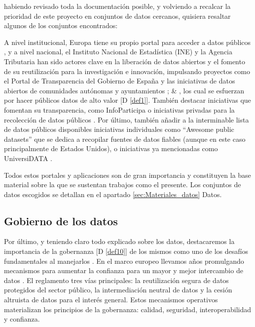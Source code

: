	habiendo revisado toda la documentación posible, y volviendo a recalcar la prioridad de este proyecto en conjuntos de datos cercanos, quisiera resaltar algunos de los conjuntos encontrados:
	
	A nivel institucional, Europa tiene su propio portal para acceder a datos públicos \citep{PortalDatosEuropa}, y a nivel nacional, el Instituto Nacional de Estadística (INE) y la Agencia Tributaria han sido actores clave en la liberación de datos abiertos y el fomento de su reutilización para la investigación e innovación, impulsando proyectos como el Portal de Transparencia del Gobierno de España y las iniciativas de datos abiertos de comunidades autónomas y ayuntamientos \citep{PortalDatosGob}; \citep{PortalDatosMadrid} \& \citep{PortalRegistradores}, los cual se esfuerzan por hacer públicos datos de alto valor [D \ref{def1}]. También destacar iniciativas que fomentan su transparencia, como InfoParticipa \citep{PortalInfoparticipa} o iniciativas privadas para la recolección de datos públicos \citep{PortalEsriEspanna}. Por último, también añadir a la interminable lista de datos públicos disponibles iniciativas individuales como ``Awesome public datasets'' \citep{awesomePublicDatasets} que se dedica a recopilar fuentes de datos fiables (aunque en este caso principalmente de Estados Unidos), o iniciativas ya mencionadas como UniversiDATA \citep{UniversiDATA}.
	
	Todos estos portales y aplicaciones son de gran importancia y constituyen la base material sobre la que se sustentan trabajos como el presente. Los conjuntos de datos escogidos se detallan en el apartado \ref{sec:Materiales_datos} Datos.
	
	\subsection{Gobierno de los datos} \label{sec:EstudiosDatosGobernanza}
	
	Por último, y teniendo claro todo explicado sobre los datos, destacaremos la importancia de la gobernanza [D \ref{def10}] de los mismos como uno de los desafíos fundamentales al manejarlos \citep{DataManagement2024Theodorakopoulos}. En el marco europeo llevamos años promulgando mecanismos para aumentar la confianza para un mayor y mejor intercambio de datos \citep{EU_DGA_2022}. El reglamento tres vías principales: la reutilización segura de datos protegidos del sector público, la intermediación neutral de datos y la cesión altruista de datos para el interés general. Estos mecanismos operativos materializan los principios de la gobernanza: calidad, seguridad, interoperabilidad y confianza.
	
